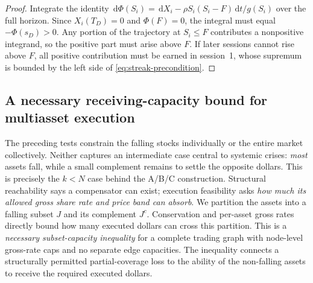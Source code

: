 \documentclass[11pt]{article}
\numberwithin{equation}{section}
\theoremstyle{definition}
\theoremstyle{remark}
\newcommand{\dd}{\,\mathrm{d}}
\begin{document}
\begin{proof}
Integrate the identity $\dd\Phi(S_i)=\dd X_i-\rho S_i(S_i-F)\dd t/g(S_i)$ over the full horizon. Since $X_i(T_D)=0$ and $\Phi(F)=0$, the integral must equal $-\Phi(s_D)>0$. Any portion of the trajectory at $S_i\le F$ contributes a nonpositive integrand, so the positive part must arise above $F$. If later sessions cannot rise above $F$, all positive contribution must be earned in session~1, whose supremum is bounded by the left side of \eqref{eq:streak-precondition}.
\end{proof}


\subsection{A necessary receiving-capacity bound for multiasset execution}\label{subsec:multiday-cut}
The preceding tests constrain the falling stocks individually or the entire market collectively. Neither captures an intermediate case central to systemic crises: \emph{most} assets fall, while a small complement remains to settle the opposite dollars. This is precisely the $k<N$ case behind the A/B/C construction. Structural reachability says a compensator can exist; execution feasibility asks \emph{how much its allowed gross share rate and price band can absorb}. We partition the assets into a falling subset $J$ and its complement $J^c$. Conservation and per-asset gross rates directly bound how many executed dollars can cross this partition. This is a \emph{necessary subset-capacity inequality} for a complete trading graph with node-level gross-rate caps and no separate edge capacities. The inequality connects a structurally permitted partial-coverage loss to the ability of the non-falling assets to receive the required executed dollars.
\end{document}
